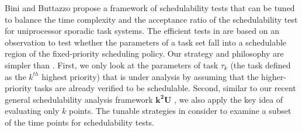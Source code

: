 \documentclass[10pt,conference]{IEEEtran}
\newcommand{\frameworkku}[1]{$\mathbf{k^2U}$}
\begin{document}
Bini and Buttazzo \cite{DBLP:journals/tc/BiniB04} propose a framework
of schedulability tests that can be tuned to balance the time
complexity and the acceptance ratio of the schedulability test for
uniprocessor sporadic task systems.  The efficient tests in
\cite{DBLP:journals/tc/BiniB04} are based on an observation to test
whether the parameters of a task set fall into a schedulable region of
the fixed-priority scheduling policy.  Our strategy and philosophy are
simpler than \cite{DBLP:journals/tc/BiniB04}.  First, we only look at
the parameters of task $\tau_k$ (the task defined as the $k^{th}$
highest priority) that is under analysis by assuming that the
higher-priority tasks are already verified to be schedulable. Second,
similar to our recent general schedulability analysis framework
\frameworkku{} \cite{ChenHLRTSS2015}, we also apply the key idea of evaluating only $k$
points.  The tunable strategies in \cite{DBLP:journals/tc/BiniB04}
consider to examine a subset of the time points for schedulability
tests.
\end{document}
